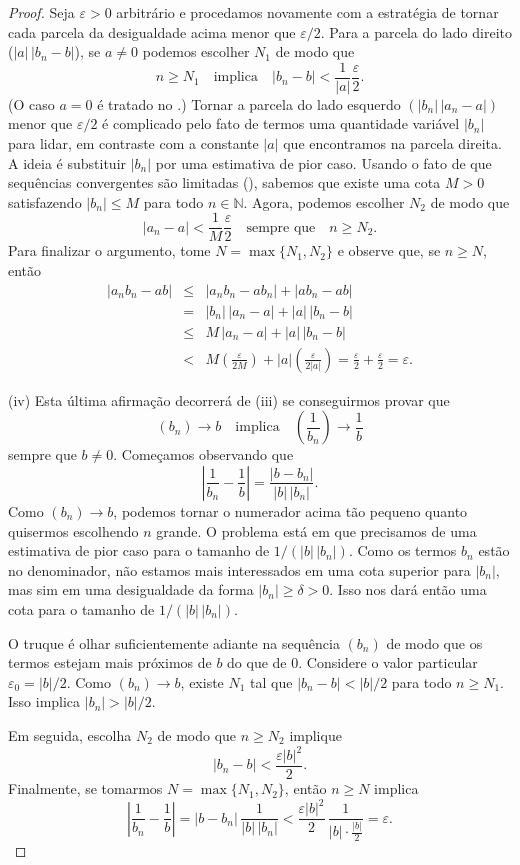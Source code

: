 \begin{proof}
Seja $\varepsilon > 0$ arbitrário e procedamos novamente com a estratégia de tornar cada parcela da desigualdade acima menor que $\varepsilon/2$. Para a parcela do lado direito ($|a|\,|b_n - b|$), se $a \neq 0$ podemos escolher $N_1$ de modo que
\[
n \geq N_1 \quad \text{implica} \quad |b_n - b| < \frac{1}{|a|} \frac{\varepsilon}{2}.
\]
(O caso $a = 0$ é tratado no .) Tornar a parcela do lado esquerdo $(|b_n|\,|a_n - a|)$ menor que $\varepsilon/2$ é complicado pelo fato de termos uma quantidade variável $|b_n|$ para lidar, em contraste com a constante $|a|$ que encontramos na parcela direita. A ideia é substituir $|b_n|$ por uma estimativa de pior caso. Usando o fato de que sequências convergentes são limitadas (), sabemos que existe uma cota $M > 0$ satisfazendo $|b_n| \leq M$ para todo $n \in \mathbb{N}$. Agora, podemos escolher $N_2$ de modo que
\[
|a_n - a| < \frac{1}{M} \frac{\varepsilon}{2} \quad \text{sempre que} \quad n \geq N_2.
\]
Para finalizar o argumento, tome $N = \max\{N_1, N_2\}$ e observe que, se $n \geq N$, então
\[
\begin{array}{rcl}
|a_n b_n - ab|
& \leq & |a_n b_n - ab_n| + |ab_n - ab| \\[2pt]
& = & |b_n|\, |a_n - a| + |a|\, |b_n - b| \\[2pt]
& \leq & M\, |a_n - a| + |a|\, |b_n - b| \\[2pt]
& < & M \left( \frac{\varepsilon}{2M} \right) + |a| \left( \frac{\varepsilon}{2|a|} \right) = \frac{\varepsilon}{2} + \frac{\varepsilon}{2} = \varepsilon.
\end{array}
\]

(iv) Esta última afirmação decorrerá de (iii) se conseguirmos provar que
\[
(b_n) \to b \quad \text{implica} \quad \left( \frac{1}{b_n} \right) \to \frac{1}{b}
\]
sempre que $b \neq 0$. Começamos observando que
\[
\left| \frac{1}{b_n} - \frac{1}{b} \right| = \frac{|b - b_n|}{|b|\,|b_n|}.
\]
Como $(b_n) \to b$, podemos tornar o numerador acima tão pequeno quanto quisermos escolhendo $n$ grande. O problema está em que precisamos de uma estimativa de pior caso para o tamanho de $1/(|b|\,|b_n|)$. Como os termos $b_n$ estão no denominador, não estamos mais interessados em uma cota superior para $|b_n|$, mas sim em uma desigualdade da forma $|b_n| \geq \delta > 0$. Isso nos dará então uma cota para o tamanho de $1/(|b|\,|b_n|)$.

O truque é olhar suficientemente adiante na sequência $(b_n)$ de modo que os termos estejam mais próximos de $b$ do que de $0$. Considere o valor particular $\varepsilon_0 = |b|/2$. Como $(b_n) \to b$, existe $N_1$ tal que $|b_n - b| < |b|/2$ para todo $n \geq N_1$. Isso implica $|b_n| > |b|/2$.

Em seguida, escolha $N_2$ de modo que $n \geq N_2$ implique
\[
|b_n - b| < \frac{\varepsilon |b|^2}{2}.
\]
Finalmente, se tomarmos $N = \max\{N_1, N_2\}$, então $n \geq N$ implica
\[
\left| \frac{1}{b_n} - \frac{1}{b} \right|
= |b - b_n| \, \frac{1}{|b|\,|b_n|}
< \frac{\varepsilon |b|^2}{2}\, \frac{1}{|b| \cdot \frac{|b|}{2}} = \varepsilon.
\]
\end{proof}

